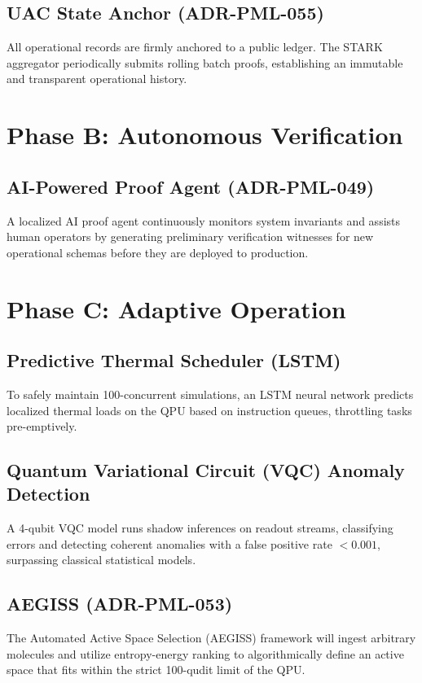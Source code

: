 \documentclass[11pt,a4paper]{article}
\begin{document}
\subsection{UAC State Anchor (ADR-PML-055)}
All operational records are firmly anchored to a public ledger. The STARK aggregator periodically submits rolling batch proofs, establishing an immutable and transparent operational history.

\section{Phase B: Autonomous Verification}
\subsection{AI-Powered Proof Agent (ADR-PML-049)}
A localized AI proof agent continuously monitors system invariants and assists human operators by generating preliminary verification witnesses for new operational schemas before they are deployed to production.

\section{Phase C: Adaptive Operation}
\subsection{Predictive Thermal Scheduler (LSTM)}
To safely maintain 100-concurrent simulations, an LSTM neural network predicts localized thermal loads on the QPU based on instruction queues, throttling tasks pre-emptively.

\subsection{Quantum Variational Circuit (VQC) Anomaly Detection}
A 4-qubit VQC model runs shadow inferences on readout streams, classifying errors and detecting coherent anomalies with a false positive rate $<0.001$, surpassing classical statistical models.

\subsection{AEGISS (ADR-PML-053)}
The Automated Active Space Selection (AEGISS) framework will ingest arbitrary molecules and utilize entropy-energy ranking to algorithmically define an active space that fits within the strict 100-qudit limit of the QPU.
\end{document}
